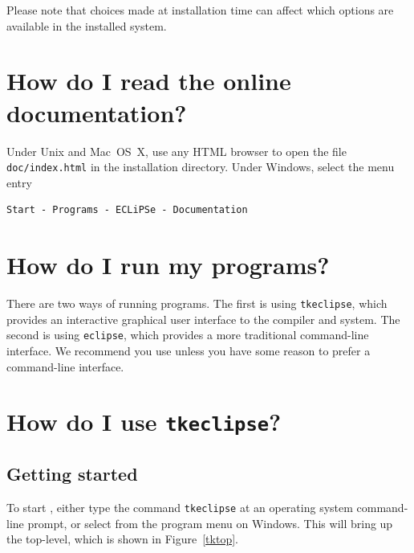 Please note that choices made at installation time can affect which
options are available in the installed system.

\section{How do I read the online documentation?}
Under Unix and Mac~OS~X, use any HTML browser to open the file \verb+doc/index.html+
in the \eclipse{} installation directory.
Under Windows, select the menu entry
\begin{verbatim}
Start - Programs - ECLiPSe - Documentation
\end{verbatim}

\section{How do I run my {\eclipse} programs?}
There are two ways of running {\eclipse} programs.  The first is using
\texttt{tkeclipse}, which provides an interactive graphical user
interface to the {\eclipse} compiler and system.  The second is using
\texttt{eclipse}, which provides a more traditional command-line
interface.  We recommend you use {\tkeclipse} unless you have some
reason to prefer a command-line interface.

\section{How do I use \texttt{tkeclipse}?}

\subsection{Getting started}

To start {\tkeclipse}, either type the command \texttt{tkeclipse} at
an operating system command-line prompt, or select {\tkeclipse} from
the program menu on Windows.  This will bring up the {\tkeclipse}
top-level, which is shown in Figure~\ref{tktop}.


